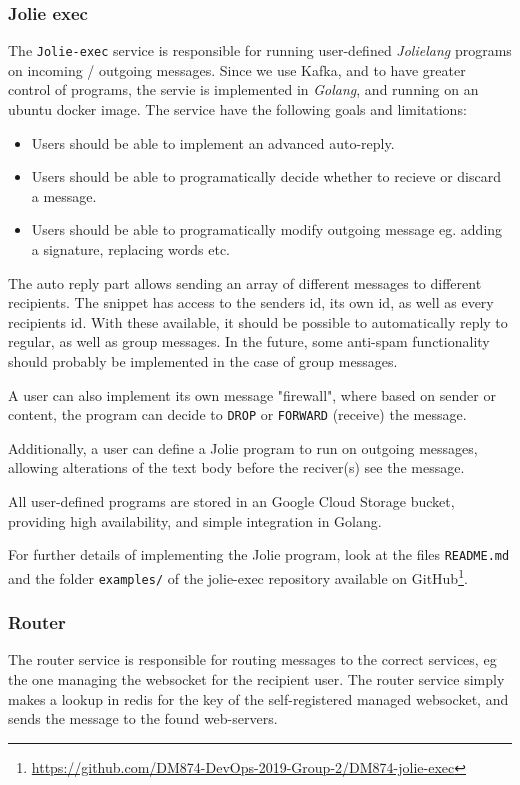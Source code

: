 \subsubsection{Jolie exec}
The \texttt{Jolie-exec} service is responsible for running user-defined \textit{Jolielang} programs on incoming / outgoing messages. 
Since we use Kafka, and to have greater control of programs, the servie is implemented in \textit{Golang}, and running on an ubuntu docker image.
The service have the following goals and limitations:
\begin{itemize}
    \item Users should be able to implement an advanced auto-reply.
    \item Users should be able to programatically decide whether to recieve or discard a message.
    \item Users should be able to programatically modify outgoing message eg. adding a signature, replacing words etc.
\end{itemize}

The auto reply part allows sending an array of different messages to different recipients. 
The snippet has access to the senders id, its own id, as well as every recipients id.
With these available, it should be possible to automatically reply to regular, as well as group messages.
In the future, some anti-spam functionality should probably be implemented in the case of group messages.

A user can also implement its own message "firewall", where based on sender or content, the program can decide to \texttt{DROP} or \texttt{FORWARD} (receive) the message.

Additionally, a user can define a Jolie program to run on outgoing messages, allowing alterations of the text body before the reciver(s) see the message.

\medskip

All user-defined programs are stored in an Google Cloud Storage bucket, providing high availability, and simple integration in Golang.

For further details of implementing the Jolie program, look at the files \texttt{README.md} and the folder \texttt{examples/} of the jolie-exec repository available on GitHub\footnote{\url{https://github.com/DM874-DevOps-2019-Group-2/DM874-jolie-exec}}.

\subsubsection{Router}
The router service is responsible for routing messages to the correct services, eg the one managing the websocket for the recipient user.
The router service simply makes a lookup in redis for the key of the self-registered managed websocket, and sends the message to the found web-servers.
